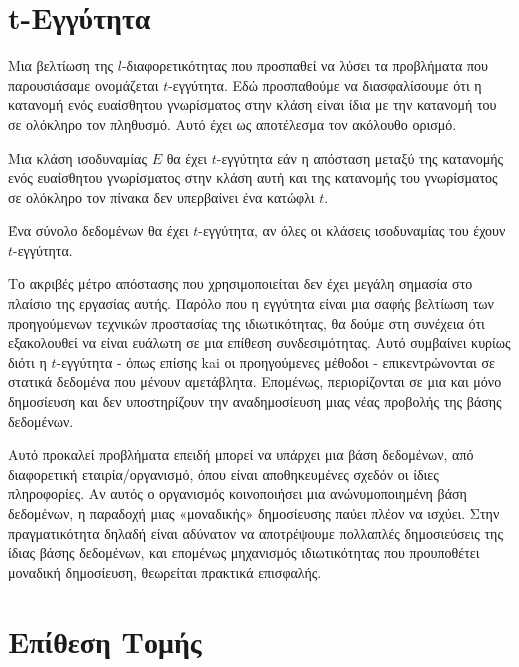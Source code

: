 \clearpage
\section{\textlatin{t}-Εγγύτητα}

Μια βελτίωση της $l$-διαφορετικότητας που προσπαθεί να λύσει τα προβλήματα που παρουσιάσαμε ονομάζεται $t$-εγγύτητα. Εδώ προσπαθούμε να διασφαλίσουμε ότι η κατανομή ενός ευαίσθητου γνωρίσματος στην κλάση είναι ίδια με την κατανομή του σε ολόκληρο τον πληθυσμό. Αυτό έχει ως αποτέλεσμα τον ακόλουθο ορισμό.

\begin{definition}
Μια κλάση ισοδυναμίας $E$ θα έχει $t$-εγγύτητα εάν η απόσταση μεταξύ της κατανομής ενός ευαίσθητου γνωρίσματος στην κλάση αυτή και της κατανομής του γνωρίσματος σε ολόκληρο τον πίνακα δεν υπερβαίνει ένα κατώφλι $t$.
\end{definition}

\begin{definition}
Ένα σύνολο δεδομένων θα έχει $t$-εγγύτητα, αν όλες οι κλάσεις ισοδυναμίας του έχουν $t$-εγγύτητα.
\end{definition}

Το ακριβές μέτρο απόστασης που χρησιμοποιείται δεν έχει μεγάλη σημασία στο πλαίσιο της εργασίας αυτής. Παρόλο που η εγγύτητα είναι μια σαφής βελτίωση των προηγούμενων τεχνικών προστασίας της ιδιωτικότητας, θα δούμε στη συνέχεια ότι εξακολουθεί να είναι ευάλωτη σε μια επίθεση συνδεσιμότητας. Αυτό συμβαίνει κυρίως διότι η $t$-εγγύτητα - όπως επίσης kai οι προηγούμενες μέθοδοι - επικεντρώνονται σε στατικά δεδομένα που μένουν αμετάβλητα. Επομένως, περιορίζονται σε μια και μόνο δημοσίευση και δεν υποστηρίζουν την αναδημοσίευση μιας νέας προβολής της βάσης δεδομένων. 

Αυτό προκαλεί προβλήματα επειδή μπορεί να υπάρχει μια βάση δεδομένων, από διαφορετική εταιρία/οργανισμό, όπου είναι αποθηκευμένες σχεδόν οι ίδιες πληροφορίες.
Αν αυτός ο οργανισμός κοινοποιήσει μια ανώνυμοποιημένη βάση δεδομένων, η παραδοχή μιας «μοναδικής» δημοσίευσης παύει πλέον να ισχύει. Στην πραγματικότητα δηλαδή είναι αδύνατον να αποτρέψουμε πολλαπλές δημοσιεύσεις της ίδιας βάσης δεδομένων, και επομένως μηχανισμός ιδιωτικότητας που προυποθέτει μοναδική δημοσίευση, θεωρείται πρακτικά επισφαλής. 








\section{Επίθεση Τομής}

